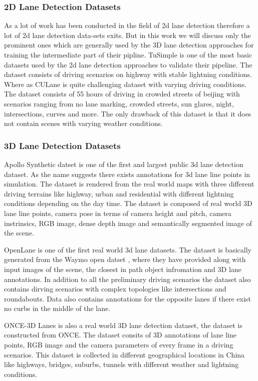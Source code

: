 \subsubsection{2D Lane Detection Datasets}
As a lot of work has been conducted in the field of 2d lane detection therefore a lot of 2d lane detection data-sets exits. But in this work we will discuss only the prominent ones which are generally used by the 3D lane detection approaches for training the intermediate part of their pipline. \cite{Tusimple} TuSimple is one of the most basic datasets used by the 2d lane detection approaches to validate their pipeline. The dataset consists of driving scenarios on highway with stable lightning conditions. Where as CULane \cite{pan2018SCNN} is quite challenging dataset with varying driving conditions. The dataset consists of 55 hours of driving in crowded streets of beijing with scenarios ranging from no lane marking, crowded streets, sun glares, night, intersections, curves and more. The only drawback of this dataset is that it does not contain scenes with varying weather conditions.

\subsubsection{3D Lane Detection Datasets}
Apollo Synthetic datset\cite{guo2020gen} is one of the first and largest public 3d lane detection dataset. As the name suggests there exists annotations for 3d lane line points in simulation. The dataset is rendered from the real world maps with three different driving terrains like highway, urban and residential with different lightning conditions depending on the day time. The dataset is composed of real world 3D lane line points, camera pose in terms of camera height and pitch, camera instrinsics, RGB image, dense depth image and semantically segmented image of the scene.

OpenLane \cite{chen2022persformer} is one of the first real world 3d lane datasets. The dataset is basically generated from the Waymo open datset \cite{Sun_2020_CVPR}, where they have provided along with input images of the scene, the closest in path object infromation and 3D lane annotations. In addition to all the preliminary driving scenarios the dataset also contains dirving scenarios with complex topologies like intersections and roundabouts. Data also contains annotations for the opposite lanes if there exist no curbs in the middle of the lane. 

ONCE-3D Lanes \cite{yan2022once} is also a real world 3D lane detection dataset, the dataset is constructed from ONCE\cite{mao2021one}. The dataset consits of 3D annotations of lane line points, RGB image and the camera parameters of every frame in a driving scenarios. This dataset is collected in different geographical locations in China like highways, bridges, suburbs, tunnels with different weather and lightning conditions.


